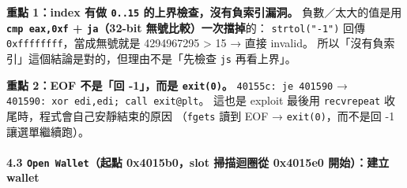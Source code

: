 \documentclass[10pt,a4paper]{article}
\begin{document}
\textbf{重點 1：index 有做 \texttt{0..\allowbreak{}15} 的上界檢查，沒有負索引漏洞。}
負數／太大的值是用 \textbf{\texttt{cmp\ \allowbreak{}eax,\allowbreak{}0xf} + \texttt{ja}（32-bit
無號比較）一次擋掉}的： \texttt{strtol("-\allowbreak{}1")} 回傳
\texttt{0xffffffff}，當成無號就是 4294967295 \textgreater{} 15 → 直接
invalid。 所以「沒有負索引」這個結論是對的，但理由不是「先檢查
\texttt{js} 再看上界」。

\textbf{重點 2：EOF 不是「回 -1」，而是 \texttt{exit(0)}。}
\texttt{40155c:\allowbreak{}\ \allowbreak{}je\ \allowbreak{}401590} →
\texttt{401590:\allowbreak{}\ \allowbreak{}xor\ \allowbreak{}edi,\allowbreak{}edi;\ \allowbreak{}call\ \allowbreak{}exit@plt}。 這也是 exploit 最後用
\texttt{recvrepeat} 收尾時，程式會自己安靜結束的原因 （\texttt{fgets}
讀到 EOF → \texttt{exit(0)}，而不是回 -1 讓選單繼續跑）。

\paragraph{\texorpdfstring{4.3 \texttt{Open\ \allowbreak{}Wallet}（起點
0x4015b0，slot 掃描迴圈從 0x4015e0 開始）：建立
wallet}{4.3 Open Wallet（起點 0x4015b0，slot 掃描迴圈從 0x4015e0 開始）：建立 wallet}}\label{open-walletux8d77ux9ede-0x4015b0slot-ux6383ux63cfux8ff4ux5708ux5f9e-0x4015e0-ux958bux59cbux5efaux7acb-wallet}
\end{document}
